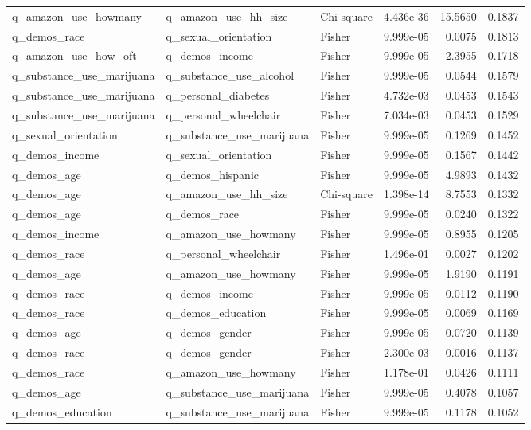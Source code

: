 \begin{longtable}[t]{llllrr}
q\_amazon\_use\_howmany & q\_amazon\_use\_hh\_size & Chi-square & 4.436e-36 & 15.5650 & 0.1837\\
q\_demos\_race & q\_sexual\_orientation & Fisher & 9.999e-05 & 0.0075 & 0.1813\\
\addlinespace
q\_amazon\_use\_how\_oft & q\_demos\_income & Fisher & 9.999e-05 & 2.3955 & 0.1718\\
q\_substance\_use\_marijuana & q\_substance\_use\_alcohol & Fisher & 9.999e-05 & 0.0544 & 0.1579\\
q\_substance\_use\_marijuana & q\_personal\_diabetes & Fisher & 4.732e-03 & 0.0453 & 0.1543\\
q\_substance\_use\_marijuana & q\_personal\_wheelchair & Fisher & 7.034e-03 & 0.0453 & 0.1529\\
q\_sexual\_orientation & q\_substance\_use\_marijuana & Fisher & 9.999e-05 & 0.1269 & 0.1452\\
\addlinespace
q\_demos\_income & q\_sexual\_orientation & Fisher & 9.999e-05 & 0.1567 & 0.1442\\
q\_demos\_age & q\_demos\_hispanic & Fisher & 9.999e-05 & 4.9893 & 0.1432\\
q\_demos\_age & q\_amazon\_use\_hh\_size & Chi-square & 1.398e-14 & 8.7553 & 0.1332\\
q\_demos\_age & q\_demos\_race & Fisher & 9.999e-05 & 0.0240 & 0.1322\\
q\_demos\_income & q\_amazon\_use\_howmany & Fisher & 9.999e-05 & 0.8955 & 0.1205\\
\addlinespace
q\_demos\_race & q\_personal\_wheelchair & Fisher & 1.496e-01 & 0.0027 & 0.1202\\
q\_demos\_age & q\_amazon\_use\_howmany & Fisher & 9.999e-05 & 1.9190 & 0.1191\\
q\_demos\_race & q\_demos\_income & Fisher & 9.999e-05 & 0.0112 & 0.1190\\
q\_demos\_race & q\_demos\_education & Fisher & 9.999e-05 & 0.0069 & 0.1169\\
q\_demos\_age & q\_demos\_gender & Fisher & 9.999e-05 & 0.0720 & 0.1139\\
\addlinespace
q\_demos\_race & q\_demos\_gender & Fisher & 2.300e-03 & 0.0016 & 0.1137\\
q\_demos\_race & q\_amazon\_use\_howmany & Fisher & 1.178e-01 & 0.0426 & 0.1111\\
q\_demos\_age & q\_substance\_use\_marijuana & Fisher & 9.999e-05 & 0.4078 & 0.1057\\
q\_demos\_education & q\_substance\_use\_marijuana & Fisher & 9.999e-05 & 0.1178 & 0.1052\\

\end{longtable}
